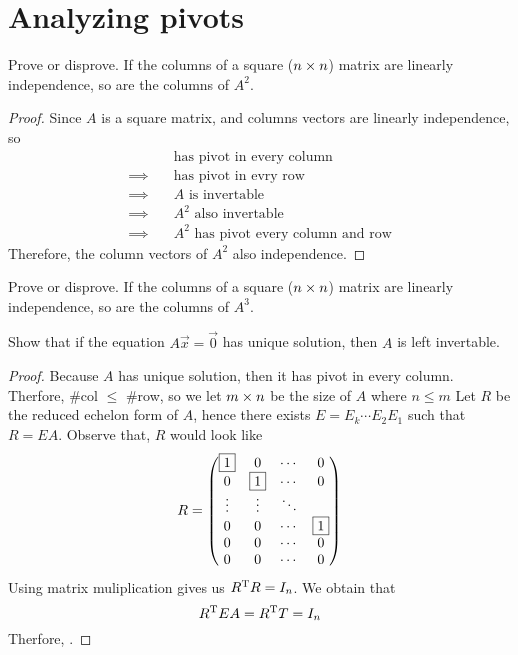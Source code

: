 \section{Analyzing pivots}


\setcounter{exercise}{5}
\begin{exercise}
  Prove or disprove. If the columns of a square ($n\times n$)
  matrix are linearly independence, so are the columns of $A^2$.
\end{exercise}
\begin{proof}
  Since $A$ is a square matrix, and columns vectors are linearly 
  independence, so
  \begin{align*}
    &\text{has pivot in every column}\\\implies\quad
    &\text{has pivot in evry row}\\\implies\quad
    &A\text{ is invertable}\\\implies\quad
    &A^2\text{ also invertable}\\\implies\quad
    &A^2\text{ has pivot every column and row}
  \end{align*}
  Therefore, the column vectors of $A^2$ also independence.
\end{proof}
\begin{exercise}
  Prove or disprove. If the columns of a square ($n\times n$)
  matrix are linearly independence, so are the columns of $A^3$.
\end{exercise}
\begin{exercise}
  Show that if the equation $A\vec{x}=\vec{0}$ has unique solution,
  then $A$ is left invertable.
\end{exercise}
\begin{proof}
  Because $A$ has unique solution, then it has pivot in every
  column. Therfore, \#col $\leq$ \#row, so we let $m\times n$ be the size
  of $A$ where $n\leq m$
  Let $R$ be the reduced 
  echelon form of $A$, hence there exists $E=E_k\cdots E_2E_1$
  such that $R=EA$.
  Observe that, $R$ would look like
  \[
    R=
    \begin{pmatrix}
      \fbox{1} &0  &\cdots &0\\
      0 &\fbox{1}  &\cdots &0\\
      \vdots&\vdots&\ddots & \\
      0 &0  &\cdots &\fbox{1}\\
      0 &0  &\cdots &0\\
      0 &0  &\cdots &0\\
    \end{pmatrix}
  \]
  Using matrix muliplication gives us $R^\mathrm{T} R=I_n$. We obtain that
  \[
    R^\mathrm{T} EA=R^\mathrm{T} T=I_n
  \]
  Therfore, 
  .



\end{proof}
